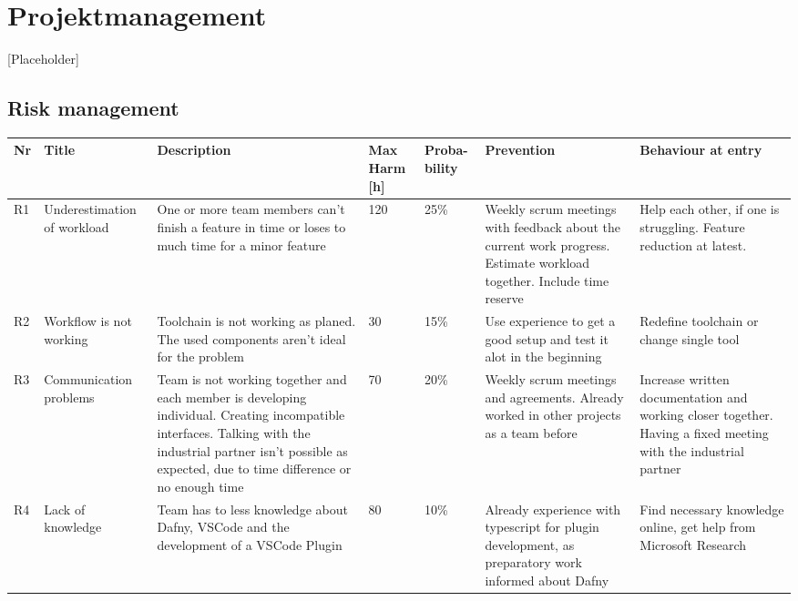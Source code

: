\section{Projektmanagement}
[Placeholder]
\subsection{Risk management}
\begin{landscape}
	\begin{longtable}[H]
		{l|p{}| p{} | p{} | p{} | p{} | p{}}
		
		\textbf{Nr} & \textbf{Title} & \textbf{Description} & 
		\textbf{Max Harm [h]} & \textbf{Proba- bility} & \textbf{Prevention} &  
		\textbf{Behaviour at entry}\\ \hline
		
		R1 & Underestimation of workload & One or more team members can't finish a feature in time or loses to much time for a minor feature & 120 & 25\% & Weekly scrum meetings with feedback about the current work progress. Estimate workload together. Include time reserve & Help each other, if one is struggling. Feature reduction at latest. \\ 
		
		R2 & Workflow is not working & Toolchain is not working as planed. The used components aren't ideal for the problem & 30 & 15\% & Use experience to get a good setup and test it alot in the beginning & Redefine toolchain or change single tool \\ 
		
		R3 & Communication problems & Team is not working together and each member is developing individual. Creating incompatible interfaces. Talking with the industrial partner isn't possible as expected, due to time difference or no enough time & 70 & 20\% & Weekly scrum meetings and agreements. Already worked in other projects as a team before & Increase written documentation and working closer together. Having a fixed meeting with the industrial partner \\ 
		
		R4 & Lack of knowledge & Team has to less knowledge about Dafny, VSCode and the development of a VSCode Plugin & 80 & 10\% & Already experience with typescript for plugin development, as preparatory work informed about Dafny & Find necessary knowledge online, get help from Microsoft Research \\ 
		

\end{longtable}
\end{landscape}
